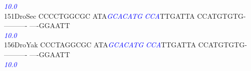 \documentclass[11pt,twoside,reqno,a4paper]{article}
\begin{document}
{\hspace*{4\charwidth}\hspace*{7\charwidth}\hspace*{1\charwidth}\hspace*{13\charwidth}\textit{\textcolor{blue}{10.0}}\hspace*{1\charwidth}\hspace*{1\charwidth}\hspace*{1\charwidth}\hspace*{1\charwidth}\hspace*{1\charwidth}\\
151\hspace*{1\charwidth}DroSec	CCCCTGGCGC	ATA\textit{\textcolor{blue}{G}}\textit{\textcolor{blue}{C}}\textit{\textcolor{blue}{A}}\textit{\textcolor{blue}{C}}\textit{\textcolor{blue}{A}}\textit{\textcolor{blue}{T}}\textit{\textcolor{blue}{G}}	\textit{\textcolor{blue}{C}}\textit{\textcolor{blue}{C}}\textit{\textcolor{blue}{A}}TTGATTA	CCATGTGTG-	----------	----GGAATT	\\
\hspace*{4\charwidth}\hspace*{7\charwidth}\hspace*{1\charwidth}\hspace*{13\charwidth}\textit{\textcolor{blue}{10.0}}\hspace*{1\charwidth}\hspace*{1\charwidth}\hspace*{1\charwidth}\hspace*{1\charwidth}\hspace*{1\charwidth}\\
156\hspace*{1\charwidth}DroYak	CCCTAGGCGC	ATA\textit{\textcolor{blue}{G}}\textit{\textcolor{blue}{C}}\textit{\textcolor{blue}{A}}\textit{\textcolor{blue}{C}}\textit{\textcolor{blue}{A}}\textit{\textcolor{blue}{T}}\textit{\textcolor{blue}{G}}	\textit{\textcolor{blue}{C}}\textit{\textcolor{blue}{C}}\textit{\textcolor{blue}{A}}TTGATTA	CCATGTGTG-	----------	----GGAATT	\\
\hspace*{4\charwidth}\hspace*{7\charwidth}\hspace*{1\charwidth}\hspace*{13\charwidth}\textit{\textcolor{blue}{10.0}}\hspace*{1\charwidth}\hspace*{1\charwidth}\hspace*{1\charwidth}\hspace*{1\charwidth}\hspace*{1\charwidth}\\
}
\end{document}
